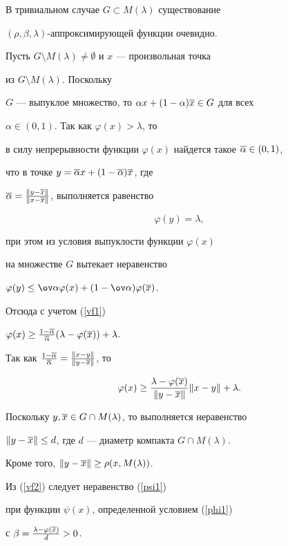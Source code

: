 \begin{pf}


В тривиальном случае $G\subset M(\lambda)$ существование 


$(\rho,\beta,\lambda)$-ап\-прок\-си\-ми\-ру\-ю\-щей функции очевидно.


Пусть $G\setminus M(\lambda)\ne\emptyset$ и $x$ --- произвольная точка 


из $G\setminus M(\lambda)$. Поскольку


$G$ --- выпуклое множество, то $\alpha x+(1-\alpha)\overline x \in G$ для всех 


$\alpha\in(0,1)$. Так как $\varphi(x)>\lambda$, то


в силу непрерывности функции $\varphi(x)$ найдется такое $\overline\alpha\in(0,1)$, 


что в точке $y=\overline\alpha x+(1-\overline\alpha)\overline x$, где


$\overline\alpha=\frac{\|y-\overline x\|}{\|x-\overline x\|}$, выполняется равенство


\begin{equation}\label{vf1}


\varphi(y)=\lambda,


\end{equation}


при этом из условия выпуклости функции $\varphi(x)$ 


на множестве $G$ вытекает неравенство


$\varphi(y)\leq\ov\alpha\varphi(x)+(1-\ov\alpha)\varphi(\o x)$. 


Отсюда с учетом (\ref{vf1})


$\varphi(x)\geq\frac{1-\overline\alpha}{\overline\alpha}(\lambda-\varphi(\overline x))+\lambda$. 


Так как $\frac{1-\overline\alpha}{\overline\alpha}=\frac{\|x-y\|}{\|y-\overline x\|}$, то


\begin{equation}\label{vf2}


\varphi(x)\geq\frac{\lambda-\varphi(\o x)}{\|y-\o x\|}\|x-y\|+\lambda.


\end{equation}


Поскольку $y,\overline x\in G\cap M(\lambda)$, то выполняется неравенство 


$\|y-\overline x\|\leq d$, где $d$ --- диаметр компакта $G\cap M(\lambda)$.


Кроме того, $\|y-\overline x\|\geq\rho(x,M(\lambda))$.


Из (\ref{vf2}) следует неравенство (\ref{psi1})


при функции $\psi(x)$, определенной условием (\ref{phi1})


с $\beta=\frac{\lambda-\varphi(\overline x)}{d}>0$.


\end{pf}






